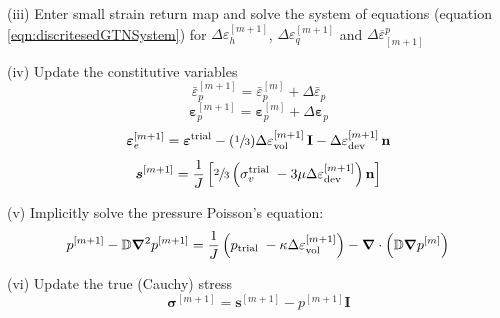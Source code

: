 \documentclass[sn-mathphys,Numbered,draft]{sn-jnl}%
\newcommand{\bb}{\boldsymbol}
\begin{document}
\begin{algorithm}[htbp]
(iii) Enter small strain return map and solve the system of equations (equation \ref{eqn:discritesedGTNSystem}) for $\Delta {\varepsilon}^{[m+1]}_h$, $\Delta {\varepsilon}^{[m+1]}_q$ and $\Delta \overline{{\varepsilon}}^p_{[m+1]}$


(iv) Update the constitutive variables
\begin{equation}
	\bar{\varepsilon}_p^{[m+1]} = \bar{\varepsilon}_p^{[m]} + \Delta \bar{\varepsilon}_p \nonumber
\end{equation}
\begin{equation}
	\bb{\varepsilon}_p^{[m+1]} = \bb{\varepsilon}_p^{[m]} +\Delta \bb{\varepsilon}_p \nonumber
\end{equation}
\begin{equation}
	\boldsymbol{\varepsilon}_{e}^{[m+1]} = \boldsymbol{\varepsilon}^{\text{trial}}
	- (\sfrac{1}{3}) \Delta {\varepsilon}^{[m+1]}_\text{vol} \, \mathbf{I}
	- \Delta {\varepsilon}^{[m+1]}_\text{dev} \, \mathbf{n}\nonumber
\end{equation}
\begin{equation}
	\boldsymbol{s}^{[m+1]} =
	\frac{1}{J}
	\left[
		\sfrac{2}{3} \left(\sigma_v^{\text {trial }} - 3 \mu \Delta \varepsilon^{[m+1]}_\text{dev} \right) \mathbf{n}
	\right] \nonumber
\end{equation}


(v) Implicitly solve the pressure Poisson's equation:
\begin{equation}
	p^{[m+1]} - \mathbb{D} \bb{\nabla}^2 p^{[m+1]} =
	\frac{1}{J}\left(p_{\text {trial }} - \kappa \Delta \varepsilon^{[m+1]}_{\text{vol}} \right)
	- \bb{\nabla} \cdot \left( \mathbb{D} \bb{\nabla} p^{[m]} \right) \\
\end{equation}


(vi) Update the true (Cauchy) stress
\begin{equation}
	\boldsymbol{\sigma}^{[m+1]} = \boldsymbol{s}^{[m+1]} -  p^{[m+1]}\textbf{I} \nonumber
\end{equation}



\end{algorithm}
\end{document}
